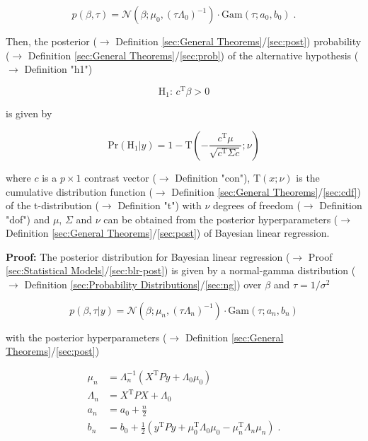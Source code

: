 \documentclass[a4paper,12pt,twoside]{book}
\begin{document}
\begin{equation} \label{eq:blr-pp-GLM-NG-prior}
p(\beta,\tau) = \mathcal{N}(\beta; \mu_0, (\tau \Lambda_0)^{-1}) \cdot \mathrm{Gam}(\tau; a_0, b_0) \; .
\end{equation}

Then, the posterior ($\rightarrow$ Definition \ref{sec:General Theorems}/\ref{sec:post}) probability ($\rightarrow$ Definition \ref{sec:General Theorems}/\ref{sec:prob}) of the alternative hypothesis ($\rightarrow$ Definition "h1")

\begin{equation} \label{eq:blr-pp-GLM-H1}
\mathrm{H}_1: \, c^\mathrm{T} \beta > 0
\end{equation}

is given by

\begin{equation} \label{eq:blr-pp-GLM-NG-PP}
\mathrm{Pr}\left( \mathrm{H}_1 | y \right) = 1 - \mathrm{T}\left( -\frac{c^\mathrm{T} \mu}{\sqrt{c^\mathrm{T} \Sigma c}}; \nu \right)
\end{equation}

where $c$ is a $p \times 1$ contrast vector ($\rightarrow$ Definition "con"), $\mathrm{T}(x; \nu)$ is the cumulative distribution function ($\rightarrow$ Definition \ref{sec:General Theorems}/\ref{sec:cdf}) of the t-distribution ($\rightarrow$ Definition "t") with $\nu$ degrees of freedom ($\rightarrow$ Definition "dof") and $\mu$, $\Sigma$ and $\nu$ can be obtained from the posterior hyperparameters ($\rightarrow$ Definition \ref{sec:General Theorems}/\ref{sec:post}) of Bayesian linear regression.


\vspace{1em}
\textbf{Proof:} The posterior distribution for Bayesian linear regression ($\rightarrow$ Proof \ref{sec:Statistical Models}/\ref{sec:blr-post}) is given by a normal-gamma distribution ($\rightarrow$ Definition \ref{sec:Probability Distributions}/\ref{sec:ng}) over $\beta$ and $\tau = 1/\sigma^2$

\begin{equation} \label{eq:blr-pp-GLM-NG-post}
p(\beta,\tau|y) = \mathcal{N}(\beta; \mu_n, (\tau \Lambda_n)^{-1}) \cdot \mathrm{Gam}(\tau; a_n, b_n)
\end{equation}

with the posterior hyperparameters ($\rightarrow$ Definition \ref{sec:General Theorems}/\ref{sec:post})

\begin{equation} \label{eq:blr-pp-GLM-NG-post-par}
\begin{split}
\mu_n &= \Lambda_n^{-1} (X^\mathrm{T} P y + \Lambda_0 \mu_0) \\
\Lambda_n &= X^\mathrm{T} P X + \Lambda_0 \\
a_n &= a_0 + \frac{n}{2} \\
b_n &= b_0 + \frac{1}{2} (y^\mathrm{T} P y + \mu_0^\mathrm{T} \Lambda_0 \mu_0 - \mu_n^\mathrm{T} \Lambda_n \mu_n) \; .
\end{split}
\end{equation}
\end{document}
